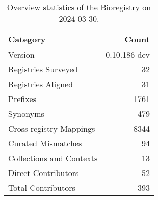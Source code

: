 \begin{table}
\caption{Overview statistics of the Bioregistry on 2024-03-30.}
\label{tab:bioregistry-summary}
\begin{tabular}{lr}
\toprule
Category & Count \\
\midrule
Version & 0.10.186-dev \\
Registries Surveyed & 32 \\
Registries Aligned & 31 \\
Prefixes & 1761 \\
Synonyms & 479 \\
Cross-registry Mappings & 8344 \\
Curated Mismatches & 94 \\
Collections and Contexts & 13 \\
Direct Contributors & 52 \\
Total Contributors & 393 \\
\bottomrule
\end{tabular}
\end{table}

